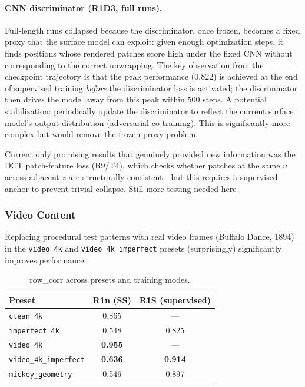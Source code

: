 \documentclass[11pt,a4paper]{article}
\begin{document}
\paragraph{CNN discriminator (R1D3, full runs).} Full-length runs collapsed because the discriminator, once frozen, becomes a fixed proxy that the surface model can exploit: given enough optimization steps, it finds positions whose rendered patches score high under the fixed CNN without corresponding to the correct unwrapping. The key observation from the checkpoint trajectory is that the peak performance (0.822) is achieved at the end of supervised training \emph{before} the discriminator loss is activated; the discriminator then drives the model away from this peak within 500 steps. A potential stabilization: periodically update the discriminator to reflect the current surface model's output distribution (adversarial co-training). This is significantly more complex but would remove the frozen-proxy problem.

Current only promising results that genuinely provided new information was the DCT patch-feature loss (R9/T4), which checks whether patches at the same $u$ across adjacent $z$ are structurally consistent—but this requires a supervised anchor to prevent trivial collapse. Still more testing needed here

\subsubsection{Video Content}

Replacing procedural test patterns with real video frames (Buffalo Dance, 1894) in the \texttt{video\_4k} and \texttt{video\_4k\_imperfect} presets (surprisingly) significantly improves performance:

\begin{table}[H]
\centering
\begin{tabular}{lcc}
\toprule
Preset & R1n (SS) & R1S (supervised) \\
\midrule
\texttt{clean\_4k} & 0.865 & --- \\
\texttt{imperfect\_4k} & 0.548 & 0.825 \\
\texttt{video\_4k} & \textbf{0.955} & --- \\
\texttt{video\_4k\_imperfect} & \textbf{0.636} & \textbf{0.914} \\
\midrule
\texttt{mickey\_geometry} & 0.546 & 0.897 \\
\bottomrule
\end{tabular}
\caption{row\_corr across presets and training modes.}
\label{tab:preset_comparison}
\end{table}
\end{document}
